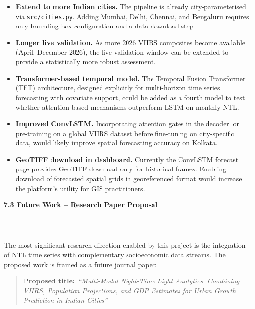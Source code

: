 \documentclass[12pt,a4paper]{report}
\begin{document}
\begin{itemize}[leftmargin=1.5cm]
    \item \textbf{Extend to more Indian cities.} The pipeline is already city-parameterised via \texttt{src/cities.py}. Adding Mumbai, Delhi, Chennai, and Bengaluru requires only bounding box configuration and a data download step.

    \item \textbf{Longer live validation.} As more 2026 VIIRS composites become available (April--December 2026), the live validation window can be extended to provide a statistically more robust assessment.

    \item \textbf{Transformer-based temporal model.} The Temporal Fusion Transformer (TFT) architecture, designed explicitly for multi-horizon time series forecasting with covariate support, could be added as a fourth model to test whether attention-based mechanisms outperform LSTM on monthly NTL.

    \item \textbf{Improved ConvLSTM.} Incorporating attention gates in the decoder, or pre-training on a global VIIRS dataset before fine-tuning on city-specific data, would likely improve spatial forecasting accuracy on Kolkata.

    \item \textbf{GeoTIFF download in dashboard.} Currently the ConvLSTM forecast page provides GeoTIFF download only for historical frames. Enabling download of forecasted spatial grids in georeferenced format would increase the platform's utility for GIS practitioners.
\end{itemize}

\vspace{0.5cm}
\begin{center}
    \hypertarget{sec:s73}{}%
    {\large \textbf{7.3 Future Work -- Research Paper Proposal}}\\[0.3cm]
    \noindent\rule{\linewidth}{0.4pt}\\[0.5cm]
\end{center}

The most significant research direction enabled by this project is the integration of NTL time series with complementary socioeconomic data streams. The proposed work is framed as a future journal paper:

\begin{quote}
\textbf{Proposed title:}~\textit{``Multi-Modal Night-Time Light Analytics: Combining VIIRS, Population Projections, and GDP Estimates for Urban Growth Prediction in Indian Cities''}
\end{quote}
\end{document}
